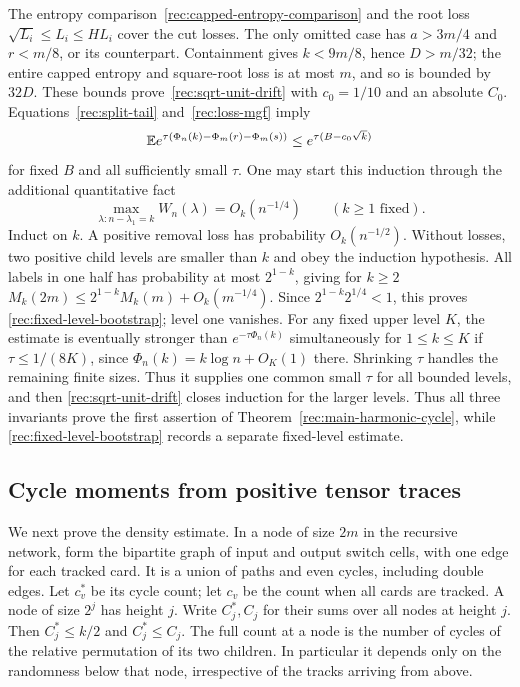 The entropy comparison~\eqref{rec:capped-entropy-comparison} and the
root loss $\sqrt{L_i}\le L_i\le HL_i$ cover the cut losses.
The only omitted case has $a>3m/4$ and $r<m/8$, or its counterpart.
Containment gives $k<9m/8$, hence $D>m/32$; the entire capped
entropy and square-root loss is at most $m$, and so is bounded by
$32D$.  These bounds prove~\eqref{rec:sqrt-unit-drift} with
$c_0=1/10$ and an absolute $C_0$.
Equations~\eqref{rec:split-tail} and~\eqref{rec:loss-mgf} imply
\[
 \mathbb E e^{\tau(\Phi_n(k)-\Phi_m(r)-\Phi_m(s))}
       \le e^{\tau(B-c_0\sqrt k)}
\]
for fixed $B$ and all sufficiently small $\tau$.
One may start this induction through the additional quantitative fact
\begin{equation}\label{rec:fixed-level-bootstrap}
 \max_{\lambda:n-\lambda_1=k}W_n(\lambda)=O_k(n^{-1/4})
 \qquad(k\ge1\text{ fixed}).
\end{equation}
Induct on $k$.  A positive removal loss has probability $O_k(n^{-1/2})$.
Without losses, two positive child levels are smaller than $k$ and obey
the induction hypothesis.  All labels in one half has probability at most
$2^{1-k}$, giving for $k\ge2$
$M_k(2m)\le2^{1-k}M_k(m)+O_k(m^{-1/4})$.
Since $2^{1-k}2^{1/4}<1$, this proves
\eqref{rec:fixed-level-bootstrap}; level one vanishes.
For any fixed upper level $K$, the estimate is eventually stronger
than $e^{-\tau\Phi_n(k)}$ simultaneously for $1\le k\le K$ if
$\tau\le1/(8K)$, since $\Phi_n(k)=k\log n+O_K(1)$ there.
Shrinking $\tau$ handles the remaining finite sizes.  Thus it supplies
one common small $\tau$ for all bounded levels, and then
\eqref{rec:sqrt-unit-drift} closes induction for the larger levels.
Thus all three invariants prove the first assertion of
Theorem~\ref{rec:main-harmonic-cycle}, while
\eqref{rec:fixed-level-bootstrap} records a separate fixed-level estimate.

\subsection{Cycle moments from positive tensor traces}
We next prove the density estimate.  In a node of size $2m$ in the
recursive network, form the bipartite graph of input and output switch
cells, with one edge for each tracked card.  It is a union of paths and
even cycles, including double edges.  Let $c_v^*$ be its cycle count;
let $c_v$ be the count when all cards are tracked.  A node of size $2^j$ has height $j$.  Write $C_j^*,C_j$
for their sums over all nodes at height $j$.  Then
$C_j^*\le k/2$ and $C_j^*\le C_j$.
The full count at a node is the number of cycles of the relative
permutation of its two children.  In particular it depends only on
the randomness below that node, irrespective of the tracks arriving
from above.

